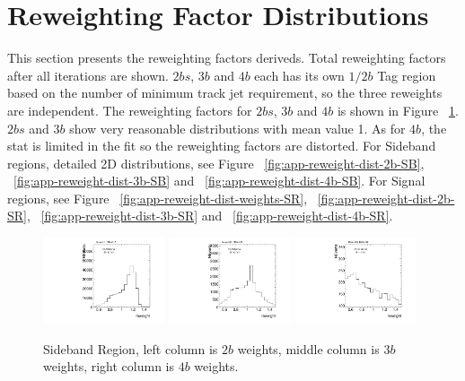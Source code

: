 \section{Reweighting Factor Distributions }
\label{app:reweight-dist}

This section presents the reweighting factors deriveds. Total reweighting factors after all iterations are shown. $2bs$, $3b$ and $4b$ each has its own $1/2b$ Tag region based on the number of minimum track jet requirement, so the three reweights are independent. The reweighting factors for $2bs$, $3b$ and $4b$ is shown in Figure ~\ref{fig:app-reweight-dist-weights-SB}. $2bs$ and $3b$ show very reasonable distributions with mean value 1. As for $4b$, the stat is limited in the fit so the reweighting factors are distorted. For Sideband regions, detailed 2D distributions, see Figure ~\ref{fig:app-reweight-dist-2b-SB}, ~\ref{fig:app-reweight-dist-3b-SB} and ~\ref{fig:app-reweight-dist-4b-SB}. For Signal regions, see Figure ~\ref{fig:app-reweight-dist-weights-SR}, ~\ref{fig:app-reweight-dist-2b-SR}, ~\ref{fig:app-reweight-dist-3b-SR} and ~\ref{fig:app-reweight-dist-4b-SR}.

\begin{figure}[htbp!]
\begin{center}
\includegraphics[width=0.32\textwidth,angle=-90]{figures/boosted/AppendixReweight/Weights/2Trk_split_Sideband_leadHCand_Pt_m_weight_projy.pdf}
\includegraphics[width=0.32\textwidth,angle=-90]{figures/boosted/AppendixReweight/Weights/3Trk_Sideband_leadHCand_Pt_m_weight_projy.pdf}
\includegraphics[width=0.32\textwidth,angle=-90]{figures/boosted/AppendixReweight/Weights/4Trk_Sideband_leadHCand_Pt_m_weight_projy.pdf}\\
\caption{Sideband Region, left column is $2b$ weights, middle column is $3b$ weights, right column is $4b$ weights.}
\label{fig:app-reweight-dist-weights-SB}
\end{center}
\end{figure}

